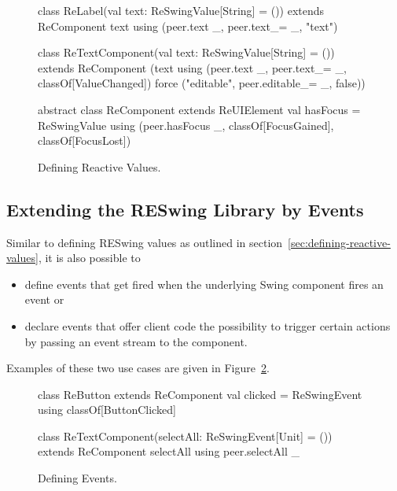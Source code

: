 \documentclass{scrartcl}
\begin{document}
\begin{figure}
\begin{codenv}
class ReLabel(val text: ReSwingValue[String] = ()) 
                             extends ReComponent {
  text using (peer.text _, peer.text_= _, "text")
}

class ReTextComponent(val text: ReSwingValue[String] = ()) 
                            extends ReComponent {
  (text using (peer.text _, peer.text_= _, classOf[ValueChanged])
        force ("editable", peer.editable_= _, false))
}

abstract class ReComponent extends ReUIElement {
  val hasFocus = ReSwingValue using (peer.hasFocus _, classOf[FocusGained],
                                                      classOf[FocusLost])
}
\end{codenv}
\caption{Defining Reactive Values.}
\label{lst:defining-reactive-values}
\end{figure}

\subsection{Extending the RESwing Library by Events}
\label{sec:defining-events}
Similar to defining RESwing values as outlined in
section~\ref{sec:defining-reactive-values}, it is also possible to
\begin{itemize}
\item define events that get fired when the underlying Swing
  component fires an event or
\item declare events that offer client code the possibility to
  trigger certain actions by passing an event stream to the
  component.
\end{itemize}

Examples of these two use cases are given in
Figure~\ref{lst:defining-events}.

\begin{figure}
\begin{codenv}
class ReButton extends ReComponent {
  val clicked = ReSwingEvent using classOf[ButtonClicked]
}

class ReTextComponent(selectAll: ReSwingEvent[Unit] = ())
                            extends ReComponent {
  selectAll using peer.selectAll _
}
\end{codenv}
\caption{Defining Events.}
\label{lst:defining-events}
\vspace{-4mm}
\end{figure}
\end{document}
